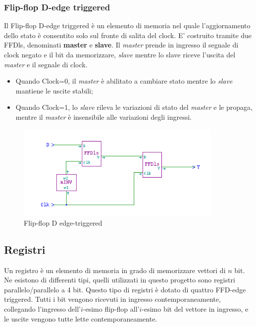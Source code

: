 \documentclass[10pt]{article}
\begin{document}
\begin{itemize}
\subsubsection{Flip-flop D-edge triggered}
Il Flip-flop D-edge triggered è un elemento di memoria nel quale l'aggiornamento dello stato è consentito solo sul fronte di salita del clock. E' costruito tramite due FFDls, 
denominati \textbf{master} e \textbf{slave}.
Il \emph{master} prende in ingresso il segnale di clock negato e il bit da memorizzare, \emph{slave} mentre lo slave riceve l'uscita del \emph{master} e il segnale di clock. 

\begin{itemize}
    \item Quando Clock=0, il \emph{master} è abilitato a cambiare stato mentre lo \emph{slave} mantiene le uscite stabili;
    \item Quando Clock=1, lo \emph{slave} rileva le variazioni di stato del \emph{master} e le propaga, mentre il \emph{master} è insensibile alle variazioni degli ingressi.
\end{itemize}

\begin{figure}[H]
    \begin{minipage}[b]{\textwidth}
    \centering
    \includegraphics[width=100mm]{ffdet}
    \caption{Flip-flop D edge-triggered}
    \label{ }
    \end{minipage}
    \end{figure}

\subsection{Registri}
Un registro è un elemento di memoria in grado di memorizzare vettori di $n$ bit. Ne esistono di differenti tipi, quelli utilizzati in questo progetto sono registri parallelo/parallelo a 4 bit.
Questo tipo di registri è dotato di quattro FFD-edge triggered. Tutti i bit vengono ricevuti in ingresso contemporaneamente, collegando l'ingresso dell'$i$-esimo flip-flop all'$i$-esimo bit del 
vettore in ingresso, e le uscite vengono tutte lette contemporaneamente. 


\end{itemize}
\end{document}
